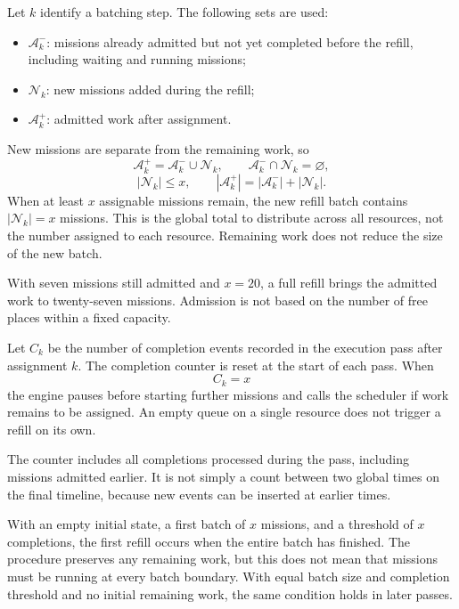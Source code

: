 Let $k$ identify a batching step. The following sets are used:
\begin{itemize}
    \item $\mathcal A_k^{-}$: missions already admitted but not yet completed
    before the refill, including waiting and running missions;
    \item $\mathcal N_k$: new missions added during the refill;
    \item $\mathcal A_k^{+}$: admitted work after assignment.
\end{itemize}
New missions are separate from the remaining work, so
\begin{equation}
    \mathcal A_k^{+}=\mathcal A_k^{-}\cup\mathcal N_k,
    \qquad \mathcal A_k^{-}\cap\mathcal N_k=\varnothing,
    \label{eq:refill-insiemi}
\end{equation}
\begin{equation}
    |\mathcal N_k|\leq x,\qquad
    |\mathcal A_k^{+}|=|\mathcal A_k^{-}|+|\mathcal N_k|.
    \label{eq:refill-additivo}
\end{equation}
When at least $x$ assignable missions remain, the new refill batch contains
$|\mathcal N_k|=x$ missions. This is the global total to distribute across all
resources, not the number assigned to each resource. Remaining work does not
reduce the size of the new batch.
\begin{example}
    With seven missions still admitted and $x=20$, a full refill brings the
    admitted work to twenty-seven missions. Admission is not based on the
    number of free places within a fixed capacity.
\end{example}

Let $C_k$ be the number of completion events recorded in the execution pass
after assignment $k$. The completion counter is reset at the start of each pass.
When
\begin{equation}
    C_k=x
    \label{eq:trigger-refill}
\end{equation}
the engine pauses before starting further missions and calls the scheduler if
work remains to be assigned. An empty queue on a single resource does not
trigger a refill on its own.

The counter includes all completions processed during the pass, including
missions admitted earlier. It is not simply a count between two global times
on the final timeline, because new events can be inserted at earlier times.

\begin{nota}
    With an empty initial state, a first batch of $x$ missions, and a threshold
    of $x$ completions, the first refill occurs when the entire batch has
    finished. The procedure preserves any remaining work, but this does not
    mean that missions must be running at every batch boundary. With equal
    batch size and completion threshold and no initial remaining work, the
    same condition holds in later passes.
\end{nota}

